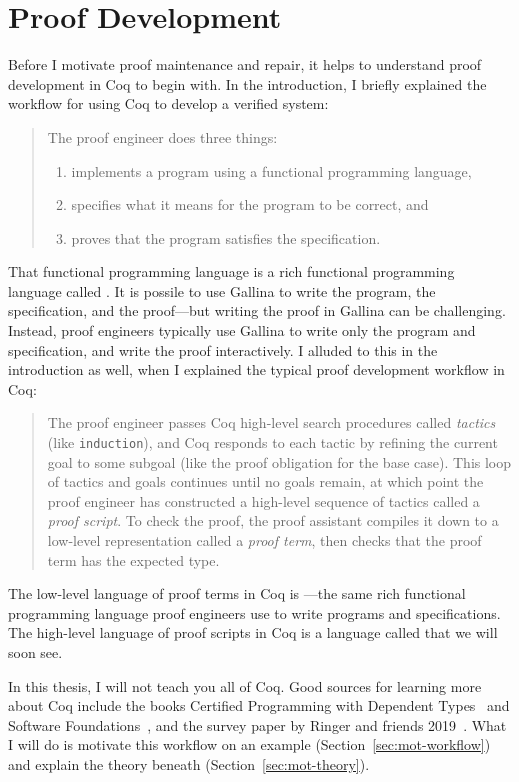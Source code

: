 \section{Proof Development}
\label{sec:mot-dev}

Before I motivate proof maintenance and repair, it helps to understand proof development in Coq to begin with.
In the introduction, I briefly explained the workflow for using Coq to develop a verified system:

\begin{quote}
The proof engineer does three things:

\begin{enumerate}
\item implements a program using a functional programming language,
\item specifies what it means for the program to be correct, and
\item proves that the program satisfies the specification.
\end{enumerate}
\end{quote}
That functional programming language is a rich functional programming language called .
It is possile to use Gallina to write the program, the specification, and the proof---but writing the proof in Gallina can be challenging.
Instead, proof engineers typically use Gallina to write only the program and specification,
and write the proof interactively.
I alluded to this in the introduction as well, when I explained the typical proof development workflow in Coq:

\begin{quote}
The proof engineer passes Coq high-level search procedures called \textit{tactics} (like \lstinline{induction}), and Coq responds to each tactic
by refining the current goal to some subgoal (like the proof obligation for the base case). This loop of tactics and goals 
continues until no goals remain, at which point the proof engineer has constructed a high-level sequence of tactics called a \textit{proof script}.
To check the proof, the proof assistant compiles it down to a low-level representation called a \textit{proof term},
then checks that the proof term has the expected type.
\end{quote}
The low-level language of proof terms in Coq is ---the same rich functional programming language proof engineers use to write programs and specifications.
The high-level language of proof scripts in Coq is a language called  that we will soon see.

In this thesis, I will not teach you all of Coq.
Good sources for learning more about Coq include the books Certified Programming with Dependent Types~\cite{chlipala:cpdt}
and Software Foundations~\cite{software-foundations}, and the survey paper by Ringer and friends 2019~\cite{PGL-045}.
What I will do is motivate this workflow on an example (Section~\ref{sec:mot-workflow})
and explain the theory beneath (Section~\ref{sec:mot-theory}).





